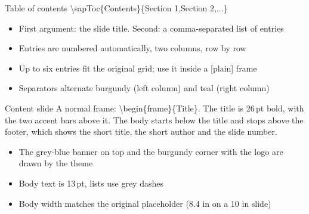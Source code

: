 \documentclass[t,aspectratio=169]{beamer}
\newcommand{\code}[1]{{\ttfamily\small #1}}
\begin{document}
\begin{frame}{Table of contents}
  \small
  \code{\textbackslash sapToc\{Contents\}\{Section 1,Section 2,...\}}
  \vspace{0.6em}
  \begin{itemize}
    \item First argument: the slide title. Second: a comma-separated list of entries
    \item Entries are numbered automatically, two columns, row by row
    \item Up to six entries fit the original grid; use it inside a \code{[plain]} frame
    \item Separators alternate burgundy (left column) and teal (right column)
  \end{itemize}
\end{frame}

\begin{frame}{Content slide}
  A normal frame: \code{\textbackslash begin\{frame\}\{Title\}}. The title is 26\,pt bold, with the two
  accent bars above it. The body starts below the title and stops above the footer, which shows
  the short title, the short author and the slide number.
  \vspace{0.8em}
  \begin{itemize}
    \item The grey-blue banner on top and the burgundy corner with the logo are drawn by the theme
    \item Body text is 13\,pt, lists use grey dashes
    \item Body width matches the original placeholder (8.4 in on a 10 in slide)
  \end{itemize}
\end{frame}
\end{document}
